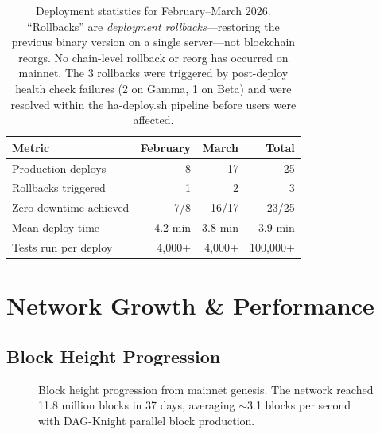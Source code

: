 \documentclass[11pt,a4paper]{article}
\begin{document}
\begin{table}[H]
\centering
\begin{tabular}{lrrr}
\toprule
\textbf{Metric} & \textbf{February} & \textbf{March} & \textbf{Total} \\
\midrule
Production deploys & 8 & 17 & 25 \\
Rollbacks triggered & 1 & 2 & 3 \\
Zero-downtime achieved & 7/8 & 16/17 & 23/25 \\
Mean deploy time & 4.2 min & 3.8 min & 3.9 min \\
Tests run per deploy & 4,000+ & 4,000+ & 100,000+ \\
\bottomrule
\end{tabular}
\caption{Deployment statistics for February--March 2026. ``Rollbacks'' are \emph{deployment rollbacks}---restoring the previous binary version on a single server---not blockchain reorgs. No chain-level rollback or reorg has occurred on mainnet. The 3 rollbacks were triggered by post-deploy health check failures (2 on Gamma, 1 on Beta) and were resolved within the ha-deploy.sh pipeline before users were affected.}
\end{table}

\section{Network Growth \& Performance}

\subsection{Block Height Progression}

\begin{figure}[H]
\centering
{}
\caption{Block height progression from mainnet genesis. The network reached 11.8 million blocks in 37 days, averaging $\sim$3.1 blocks per second with DAG-Knight parallel block production.}
\end{figure}
\end{document}
